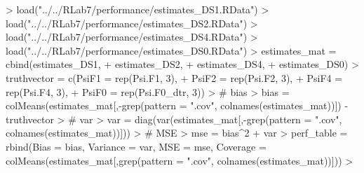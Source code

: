 \documentclass{exam}
\begin{document}
\begin{solution}
\begin{Schunk}
\begin{Sinput}
> load("../../RLab7/performance/estimates_DS1.RData")
> load("../../RLab7/performance/estimates_DS2.RData")
> load("../../RLab7/performance/estimates_DS4.RData")
> load("../../RLab7/performance/estimates_DS0.RData")
> estimates_mat = cbind(estimates_DS1,
+                       estimates_DS2,
+                       estimates_DS4,
+                       estimates_DS0)
> truthvector = c(PsiF1 = rep(Psi.F1, 3), 
+                 PsiF2 = rep(Psi.F2, 3), 
+                 PsiF4 = rep(Psi.F4, 3), 
+                 PsiF0 = rep(Psi.F0_dtr, 3))
> # bias
> bias = colMeans(estimates_mat[,-grep(pattern = ".cov", colnames(estimates_mat))]) - truthvector
> # var
> var = diag(var(estimates_mat[,-grep(pattern = ".cov", colnames(estimates_mat))]))
> # MSE
> mse = bias^2 + var
> perf_table = rbind(Bias = bias, Variance = var, MSE = mse, Coverage = colMeans(estimates_mat[,grep(pattern = ".cov", colnames(estimates_mat))]))
> 
\end{Sinput}
\end{Schunk}


\end{solution}
\end{document}
